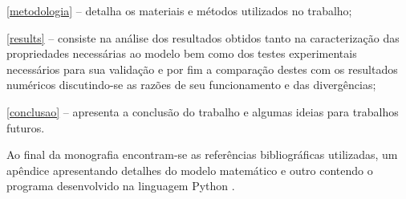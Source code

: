 \autoref{metodologia} – detalha os materiais e métodos utilizados no trabalho;
    
\autoref{results} – consiste na análise dos resultados obtidos tanto na caracterização das propriedades necessárias ao modelo bem como dos testes experimentais necessários para sua validação e por fim a comparação destes com os resultados numéricos discutindo-se as razões de seu funcionamento e das divergências;

\autoref{conclusao} – apresenta a conclusão do trabalho e algumas ideias para trabalhos futuros.
    
Ao final da monografia encontram-se as referências bibliográficas utilizadas, um apêndice apresentando detalhes do modelo matemático e outro contendo o programa desenvolvido na linguagem Python \cite{python}.